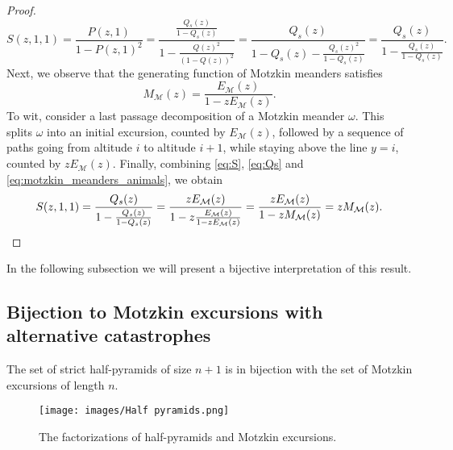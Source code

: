 \begin{proof}
\begin{equation}
    S(z,1,1) = \frac{P(z,1)}{1-P(z,1)^{2}} = \frac{\frac{Q_s(z)}{1 - Q_s(z)}}{1 - \frac{Q(z)^2}{(1-Q(z))^2}} = \frac{Q_s(z)}{1 - Q_s(z) - \frac{Q_s(z)^2}{1 - Q_s(z)}}
    = \frac{Q_s(z)}{1 - \frac{Q_s(z)}{1 - Q_s(z)}}.
  \end{equation}
  Next, we observe that the generating function of Motzkin meanders satisfies
  \begin{equation}\label{eq:motzkin_meanders_animals}
    M_\mathcal{M}(z) = \frac{E_\mathcal{M}(z)}{1-zE_\mathcal{M}(z)}.
  \end{equation}
  To wit, consider a last passage decomposition of a Motzkin meander $\omega$. This splits $\omega$ into an initial excursion, counted by $E_{\mathcal{M}}(z)$, followed by a sequence of paths going from altitude $i$ to altitude $i + 1$, while staying above the line $y = i$, counted by $z E_\mathcal{M}(z)$.
  Finally, combining \eqref{eq:S}, \eqref{eq:Qs} and \eqref{eq:motzkin_meanders_animals}, we obtain
  \begin{equation*}
    S(z,1,1) = \frac{Q_s(z)}{1 - \frac{Q_s(z)}{1 - Q_s(z)}} = \frac{zE_\mathcal{M}(z)}{1 - z\frac{E_\mathcal{M}(z)}{1-zE_\mathcal{M}(z)}} = \frac{zE_\mathcal{M}(z)}{1 - zM_\mathcal{M}(z)} = zM_\mathcal{M}(z). \qedhere
  \end{equation*}
\end{proof}

In the following subsection we will present a bijective interpretation of this result.

\subsection{Bijection to Motzkin excursions with alternative catastrophes}
\label{subsection:bijection}

\begin{lemma} \label{lemma:half_pyramids}
  The set of strict half-pyramids of size $n+1$ is in bijection with the set of Motzkin excursions of length $n$.
\end{lemma}

\begin{figure}[hbt!]
  \centering
  \texttt{[image: images/Half pyramids.png]}
  \caption{The factorizations of half-pyramids and Motzkin excursions.}
  \label{fig:half_pyramids}
\end{figure}

